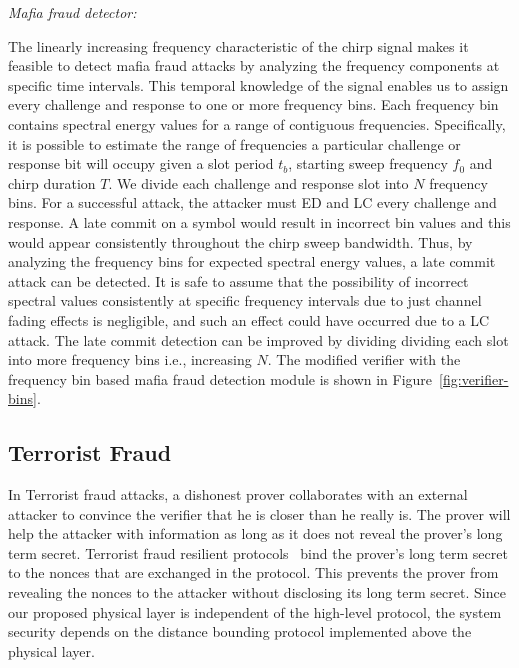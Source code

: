 \documentclass{sig-alternate-10pt}
\newcommand{\ie}{i.e.,\xspace}
\begin{document}
\emph{Mafia fraud detector:}

The linearly increasing frequency characteristic of the chirp signal makes it
feasible to detect mafia fraud attacks by analyzing the frequency components at
specific time intervals. This temporal knowledge of the signal enables us to assign
every challenge and response to one or more frequency bins. Each frequency bin
contains spectral energy values for a range of contiguous frequencies. Specifically,
it is possible to estimate the range of frequencies a particular challenge or
response bit will occupy given a slot period $t_b$, starting sweep frequency $f_0$
and chirp duration $T$. We divide each challenge and response slot into $N$
frequency bins. For a successful attack, the attacker must ED and LC every challenge
and response. A late commit on a symbol would result in incorrect bin values and
this would appear consistently throughout the chirp sweep bandwidth. Thus, by
analyzing the frequency bins for expected spectral energy values, a late commit
attack can be detected. It is safe to assume that the possibility of incorrect
spectral values consistently at specific frequency intervals due to just channel
fading effects is negligible, and such an effect could have occurred due to a LC
attack. The late commit detection can be improved by dividing dividing each slot
into more frequency bins \ie increasing $N$. The modified verifier with the
frequency bin based mafia fraud detection module is shown in
Figure~\ref{fig:verifier-bins}.

\subsection{Terrorist Fraud}
\label{subsec:terrorist-fraud}

In Terrorist fraud attacks, a dishonest prover collaborates with an external
attacker to convince the verifier that he is closer than he really is. The
prover will help the attacker with information as long as it does not reveal
the prover's long term secret. Terrorist fraud resilient
protocols~\cite{TuSep07,KimDec08,ReidMar07} bind the prover's long term secret
to the nonces that are exchanged in the protocol. This prevents the prover
from revealing the nonces to the attacker without disclosing its long term
secret. Since our proposed physical layer is independent of the high-level
protocol, the system security depends on the distance bounding protocol
implemented above the physical layer.
\end{document}
